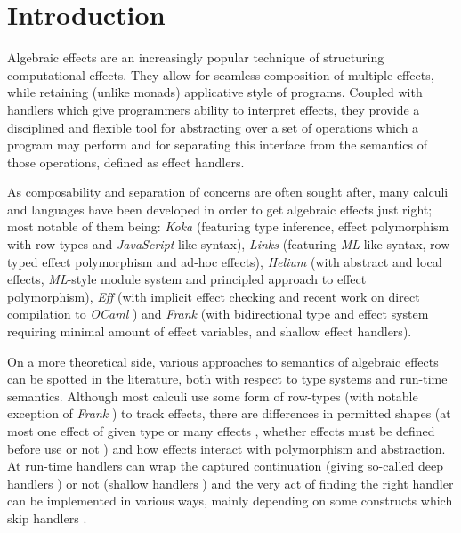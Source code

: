 \documentclass[inz, english, shortabstract]{iithesis}
\author         {Maciej Buszka}
\begin{document}
%
\chapter{Introduction}
% 
%
%
%
Algebraic effects \cite{Plotkin2003} are an increasingly popular technique of structuring computational effects.
They allow for seamless composition of multiple effects, while retaining (unlike monads) applicative style of programs.
Coupled with handlers \cite{Plotkin2013} which give programmers ability to interpret effects, they provide a disciplined and flexible tool for abstracting over a set of operations which a program may perform and for separating this interface from the semantics of those operations, defined as effect handlers.

As composability and separation of concerns are often sought after, many calculi and languages have been developed in order to get algebraic effects just right; most notable of them being: \emph{Koka} \cite{Leijen2014} (featuring type inference, effect polymorphism with row-types and \emph{JavaScript}-like syntax), \emph{Links} \cite{Hillerstrom2016} (featuring \emph{ML}-like syntax, row-typed effect polymorphism and ad-hoc effects), \emph{Helium} \cite{Biernacki2019} (with abstract and local effects, \emph{ML}-style module system and principled approach to effect polymorphism), \emph{Eff} \cite{Bauer2012} (with implicit effect checking and recent work on direct compilation to \emph{OCaml} \cite{Kiselyov2018}) and \emph{Frank} \cite{Lindley2017} (with bidirectional type and effect system requiring minimal amount of effect variables, and shallow effect handlers). 

On a more theoretical side, various approaches to semantics of algebraic effects can be spotted in the literature, both with respect to type systems and run-time semantics.
Although most calculi use some form of row-types (with notable exception of \emph{Frank} \cite{Lindley2017}) to track effects, there are differences in permitted shapes (at most one effect \cite{Hillerstrom2016} of given type or many effects \cite{Biernacki2017,Leijen2014}, whether effects must be defined before use \cite{Biernacki2017,Lindley2017,Leijen2014,Bauer2012} or not \cite{Hillerstrom2016}) and how effects interact with polymorphism and abstraction.
At run-time handlers can wrap the captured continuation (giving so-called deep handlers \cite{Biernacki2017,Hillerstrom2016,Leijen2014,Bauer2012}) or not (shallow handlers \cite{Lindley2017}) and the very act of finding the right handler can be implemented in various ways, mainly depending on some constructs which skip handlers \cite{Biernacki2017}.
\end{document}
